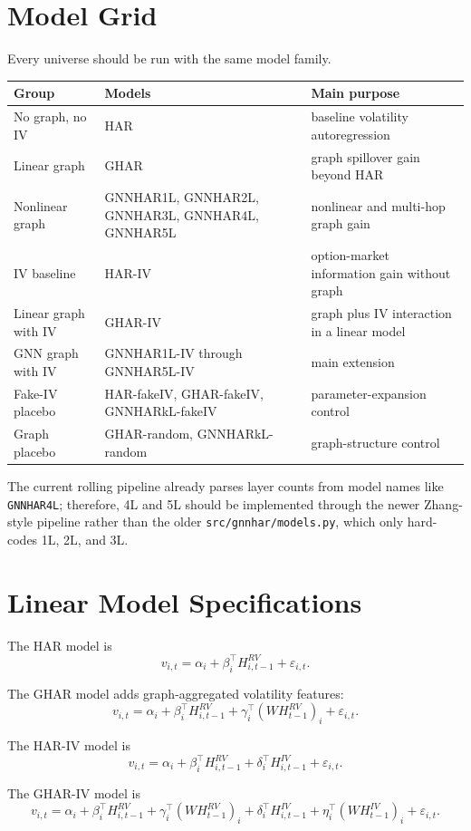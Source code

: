 \documentclass[11pt,a4paper]{article}
\begin{document}
\section{Model Grid}

Every universe should be run with the same model family.

\begin{longtable}{lll}
\toprule
Group & Models & Main purpose \\
\midrule
\endhead
No graph, no IV & HAR & baseline volatility autoregression \\
Linear graph & GHAR & graph spillover gain beyond HAR \\
Nonlinear graph & GNNHAR1L, GNNHAR2L, GNNHAR3L, GNNHAR4L, GNNHAR5L & nonlinear and multi-hop graph gain \\
IV baseline & HAR-IV & option-market information gain without graph \\
Linear graph with IV & GHAR-IV & graph plus IV interaction in a linear model \\
GNN graph with IV & GNNHAR1L-IV through GNNHAR5L-IV & main extension \\
Fake-IV placebo & HAR-fakeIV, GHAR-fakeIV, GNNHARkL-fakeIV & parameter-expansion control \\
Graph placebo & GHAR-random, GNNHARkL-random & graph-structure control \\
\bottomrule
\end{longtable}

The current rolling pipeline already parses layer counts from model names like \texttt{GNNHAR4L}; therefore, 4L and 5L should be implemented through the newer Zhang-style pipeline rather than the older \texttt{src/gnnhar/models.py}, which only hard-codes 1L, 2L, and 3L.

\section{Linear Model Specifications}

The HAR model is
\[
v_{i,t}=\alpha_i+\beta_i^\top H^{RV}_{i,t-1}+\varepsilon_{i,t}.
\]

The GHAR model adds graph-aggregated volatility features:
\[
v_{i,t}
=
\alpha_i+\beta_i^\top H^{RV}_{i,t-1}
+\gamma_i^\top (W H^{RV}_{t-1})_i
+\varepsilon_{i,t}.
\]

The HAR-IV model is
\[
v_{i,t}
=
\alpha_i+\beta_i^\top H^{RV}_{i,t-1}
+\delta_i^\top H^{IV}_{i,t-1}
+\varepsilon_{i,t}.
\]

The GHAR-IV model is
\[
v_{i,t}
=
\alpha_i+\beta_i^\top H^{RV}_{i,t-1}
+\gamma_i^\top (W H^{RV}_{t-1})_i
+\delta_i^\top H^{IV}_{i,t-1}
+\eta_i^\top (W H^{IV}_{t-1})_i
+\varepsilon_{i,t}.
\]
\end{document}
